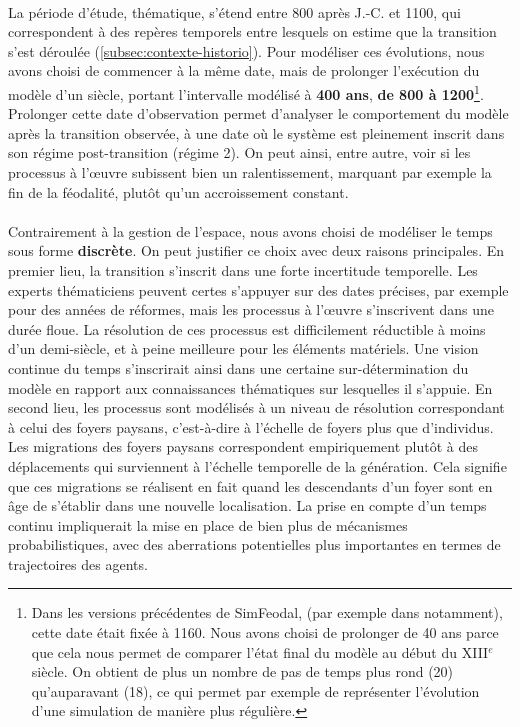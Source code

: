 \paragraph[Durée]{} La période d'étude, thématique, s'étend entre 800 après J.-C. et 1100, qui correspondent à des repères temporels entre lesquels on estime que la transition s'est déroulée (\cref{subsec:contexte-historio}).
Pour modéliser ces évolutions, nous avons choisi de commencer à la même date, mais de prolonger l'exécution du modèle d'un siècle, portant l'intervalle modélisé à \textbf{400 ans}, \textbf{de 800 à 1200}\footnote{
	Dans les versions précédentes de SimFeodal, (par exemple dans \textcite{cura_transition_2017} notamment), cette date était fixée à 1160.
	Nous avons choisi de prolonger de 40 ans parce que cela nous permet de comparer l'état final du modèle au début du XIII$^e$ siècle.
	On obtient de plus un nombre de pas de temps plus \og rond\fg{} (20) qu'auparavant (18), ce qui permet par exemple de représenter l'évolution d'une simulation de manière plus régulière.
}.
Prolonger cette date d'observation permet d'analyser le comportement du modèle après la transition observée, à une date où le système est pleinement inscrit dans son régime post-transition (régime 2).
On peut ainsi, entre autre, voir si les processus à l'œuvre subissent bien un ralentissement, marquant par exemple la fin de la féodalité, plutôt qu'un accroissement constant.

\paragraph[Discret]{} Contrairement à la gestion de l'espace, nous avons choisi de modéliser le temps sous forme \textbf{discrète}.
On peut justifier ce choix avec deux raisons principales.
En premier lieu, la transition s'inscrit dans une forte incertitude temporelle. 
Les experts thématiciens peuvent certes s'appuyer sur des dates précises, par exemple pour des années de réformes, mais les processus à l'œuvre s'inscrivent dans une durée floue.
La résolution de ces processus est difficilement réductible à moins d'un demi-siècle, et à peine meilleure pour les éléments matériels.
Une vision continue du temps s'inscrirait ainsi dans une certaine sur-détermination du modèle en rapport aux connaissances thématiques sur lesquelles il s'appuie.
En second lieu, les processus sont modélisés à un niveau de résolution correspondant à celui des \og foyers paysans\fg{}, c'est-à-dire à l'échelle de foyers plus que d'individus.
Les migrations des foyers paysans correspondent empiriquement plutôt à des déplacements qui surviennent à l'échelle temporelle de la génération.
Cela signifie que ces migrations se réalisent en fait quand les descendants d'un foyer sont en âge de s'établir dans une nouvelle localisation.
La prise en compte d'un temps continu impliquerait la mise en place de bien plus de mécanismes probabilistiques, avec des aberrations potentielles plus importantes en termes de trajectoires des agents.

